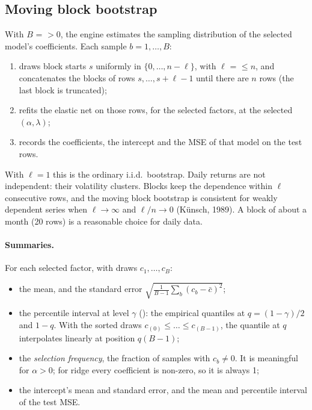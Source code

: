\documentclass[11pt,a4paper]{article}
\begin{document}
\subsection{Moving block bootstrap}\label{sec:bootstrap}

With $B$ =  $>0$, the engine estimates the sampling distribution of
the selected model's coefficients. Each sample $b=1,\dots,B$:
\begin{enumerate}
  \item draws block starts $s$ uniformly in $\{0,\dots,n-\ell\}$, with $\ell$ =
         $\le n$, and concatenates the blocks of rows
        $s,\dots,s+\ell-1$ until there are $n$ rows (the last block is truncated);
  \item refits the elastic net on those rows, for the selected factors, at the selected
        $(\alpha,\lambda)$;
  \item records the coefficients, the intercept and the MSE of that model on the test rows.
\end{enumerate}
With $\ell=1$ this is the ordinary i.i.d.\ bootstrap. Daily returns are not independent:
their volatility clusters. Blocks keep the dependence within $\ell$ consecutive rows, and the
moving block bootstrap is consistent for weakly dependent series when
$\ell\to\infty$ and $\ell/n\to0$ (K\"unsch, 1989). A block of about a month (20 rows) is a
reasonable choice for daily data.

\paragraph{Summaries.} For each selected factor, with draws $c_1,\dots,c_B$:
\begin{itemize}
  \item the mean, and the standard error $\sqrt{\frac1{B-1}\sum_b(c_b-\bar c)^2}$;
  \item the percentile interval at level $\gamma$ (): the empirical
        quantiles at $q=(1-\gamma)/2$ and $1-q$. With the sorted draws $c_{(0)}\le\dots\le
        c_{(B-1)}$, the quantile at $q$ interpolates linearly at position $q(B-1)$;
  \item the \emph{selection frequency}, the fraction of samples with $c_b\ne0$. It is
        meaningful for $\alpha>0$; for ridge every coefficient is non-zero, so it is always
        1;
  \item the intercept's mean and standard error, and the mean and percentile interval of
        the test MSE.
\end{itemize}
\end{document}
